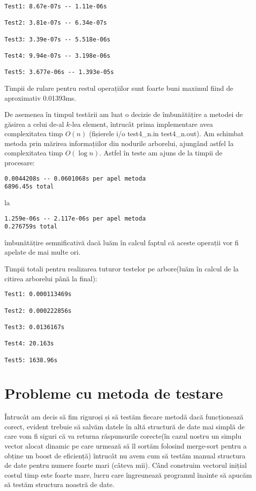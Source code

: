 \documentclass[]{report}
\begin{document}
	\begin{lstlisting}
Test1: 8.67e-07s -- 1.11e-06s

Test2: 3.81e-07s -- 6.34e-07s

Test3: 3.39e-07s -- 5.518e-06s

Test4: 9.94e-07s -- 3.198e-06s

Test5: 3.677e-06s -- 1.393e-05s
	\end{lstlisting}

	Timpii de rulare pentru restul operațiilor sunt foarte buni maximul fiind de
	aproximativ 0.01393ms.

	De asemenea în timpul testării am luat o decizie de îmbunătățire a metodei
	de găsirea a celui de-al $k$-lea element, întrucât prima implementare avea
	complexitatea timp $O(n)$ (fișierele i/o test4\_n.in test4\_n.out). Am 
	schimbat metoda prin mărirea informațiilor din nodurile arborelui, ajungând
	astfel la complexitatea timp $O(\log n)$.
	Astfel în teste am ajuns de la timpii de procesare:
	\begin{lstlisting}
0.0044208s -- 0.0601068s per apel metoda
6896.45s total	
	\end{lstlisting}

	la
	\begin{lstlisting}
1.259e-06s -- 2.117e-06s per apel metoda
0.276759s total	
	\end{lstlisting}

	îmbunătățire semnificativă dacă luăm în calcul faptul că aceste operații vor
	fi apelate de mai multe ori.


	Timpii totali pentru realizarea tuturor testelor pe arbore(luăm în calcul de
	la citirea arborelui până la final):
	\begin{lstlisting}
Test1: 0.000113469s

Test2: 0.000222856s

Test3: 0.0136167s

Test4: 20.163s

Test5: 1638.96s
	\end{lstlisting}

	\section*{Probleme cu metoda de testare}

	Întrucât am decis să fim riguroși și să testăm fiecare metodă dacă funcționează
	corect, evident trebuie	să salvăm datele în altă structură de date mai simplă
	de care vom fi siguri că va returna răspunsurile corecte(în cazul nostru un
	simplu vector alocat dinamic pe care urmează să îl sortăm folosind merge-sort
	pentru a obține un boost de eficiență) întrucât nu avem cum să testăm manual
	structura de date pentru numere foarte mari (câteva mii). Când construim 
	vectorul inițial costul timp este foarte mare, lucru care îngreunează 
	programul înainte să apucăm să testăm structura noastră de date.
\end{document}
